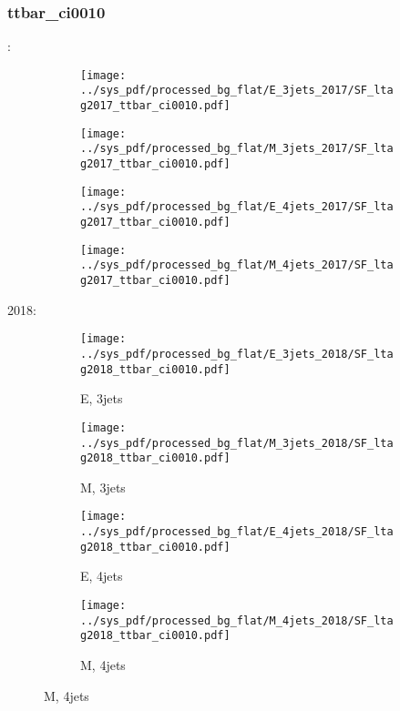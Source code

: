 \documentclass{beamer}
\begin{document}
\begin{frame}
\frametitle{ttbar_ci0010}
\fontsize{5}{1}:
\begin{figure}
\centering
\begin{subfigure}[b]{0.24\textwidth}
\texttt{[image: ../sys\_pdf/processed\_bg\_flat/E\_3jets\_2017/SF\_ltag2017\_ttbar\_ci0010.pdf]}
\end{subfigure}
\begin{subfigure}[b]{0.24\textwidth}
\texttt{[image: ../sys\_pdf/processed\_bg\_flat/M\_3jets\_2017/SF\_ltag2017\_ttbar\_ci0010.pdf]}
\end{subfigure}
\begin{subfigure}[b]{0.24\textwidth}
\texttt{[image: ../sys\_pdf/processed\_bg\_flat/E\_4jets\_2017/SF\_ltag2017\_ttbar\_ci0010.pdf]}
\end{subfigure}
\begin{subfigure}[b]{0.24\textwidth}
\texttt{[image: ../sys\_pdf/processed\_bg\_flat/M\_4jets\_2017/SF\_ltag2017\_ttbar\_ci0010.pdf]}
\end{subfigure}
\end{figure}
2018:
\begin{figure}
\centering
\begin{subfigure}[b]{0.24\textwidth}
\texttt{[image: ../sys\_pdf/processed\_bg\_flat/E\_3jets\_2018/SF\_ltag2018\_ttbar\_ci0010.pdf]}
\captionsetup{font=tiny}
\caption{E, 3jets}
\end{subfigure}
\begin{subfigure}[b]{0.24\textwidth}
\texttt{[image: ../sys\_pdf/processed\_bg\_flat/M\_3jets\_2018/SF\_ltag2018\_ttbar\_ci0010.pdf]}
\captionsetup{font=tiny}
\caption{M, 3jets}
\end{subfigure}
\begin{subfigure}[b]{0.24\textwidth}
\texttt{[image: ../sys\_pdf/processed\_bg\_flat/E\_4jets\_2018/SF\_ltag2018\_ttbar\_ci0010.pdf]}
\captionsetup{font=tiny}
\caption{E, 4jets}
\end{subfigure}
\begin{subfigure}[b]{0.24\textwidth}
\texttt{[image: ../sys\_pdf/processed\_bg\_flat/M\_4jets\_2018/SF\_ltag2018\_ttbar\_ci0010.pdf]}
\captionsetup{font=tiny}
\caption{M, 4jets}
\end{subfigure}
\end{figure}
\end{frame}
\end{document}
